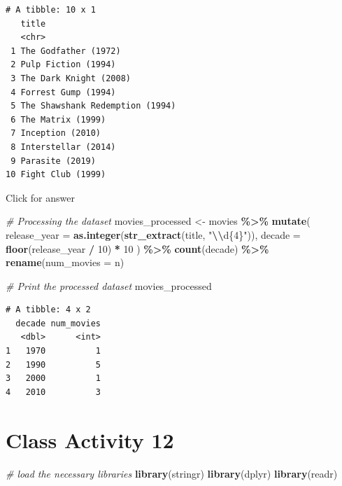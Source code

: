 \documentclass[
]{book}
\newenvironment{Shaded}{\begin{snugshade}}{\end{snugshade}}
\newcommand{\AttributeTok}[1]{\textcolor[rgb]{0.13,0.29,0.53}{#1}}
\newcommand{\CommentTok}[1]{\textcolor[rgb]{0.56,0.35,0.01}{\textit{#1}}}
\newcommand{\DecValTok}[1]{\textcolor[rgb]{0.00,0.00,0.81}{#1}}
\newcommand{\FunctionTok}[1]{\textcolor[rgb]{0.13,0.29,0.53}{\textbf{#1}}}
\newcommand{\NormalTok}[1]{#1}
\newcommand{\OtherTok}[1]{\textcolor[rgb]{0.56,0.35,0.01}{#1}}
\newcommand{\SpecialCharTok}[1]{\textcolor[rgb]{0.81,0.36,0.00}{\textbf{#1}}}
\newcommand{\StringTok}[1]{\textcolor[rgb]{0.31,0.60,0.02}{#1}}
\begin{document}
\begin{verbatim}
# A tibble: 10 x 1
   title                          
   <chr>                          
 1 The Godfather (1972)           
 2 Pulp Fiction (1994)            
 3 The Dark Knight (2008)         
 4 Forrest Gump (1994)            
 5 The Shawshank Redemption (1994)
 6 The Matrix (1999)              
 7 Inception (2010)               
 8 Interstellar (2014)            
 9 Parasite (2019)                
10 Fight Club (1999)              
\end{verbatim}

Click for answer

\begin{Shaded}
\begin{Highlighting}[]
\CommentTok{\# Processing the dataset}
\NormalTok{movies\_processed }\OtherTok{\textless{}{-}}\NormalTok{ movies }\SpecialCharTok{\%\textgreater{}\%}
  \FunctionTok{mutate}\NormalTok{(}
    \AttributeTok{release\_year =} \FunctionTok{as.integer}\NormalTok{(}\FunctionTok{str\_extract}\NormalTok{(title, }\StringTok{"}\SpecialCharTok{\textbackslash{}\textbackslash{}}\StringTok{d\{4\}"}\NormalTok{)),}
    \AttributeTok{decade =} \FunctionTok{floor}\NormalTok{(release\_year }\SpecialCharTok{/} \DecValTok{10}\NormalTok{) }\SpecialCharTok{*} \DecValTok{10}
\NormalTok{  ) }\SpecialCharTok{\%\textgreater{}\%}
  \FunctionTok{count}\NormalTok{(decade) }\SpecialCharTok{\%\textgreater{}\%}
  \FunctionTok{rename}\NormalTok{(}\AttributeTok{num\_movies =}\NormalTok{ n)}

\CommentTok{\# Print the processed dataset}
\NormalTok{movies\_processed}
\end{Highlighting}
\end{Shaded}

\begin{verbatim}
# A tibble: 4 x 2
  decade num_movies
   <dbl>      <int>
1   1970          1
2   1990          5
3   2000          1
4   2010          3
\end{verbatim}

\hypertarget{class-activity-12}{%
\chapter{Class Activity 12}\label{class-activity-12}}

\begin{Shaded}
\begin{Highlighting}[]
\CommentTok{\# load the necessary libraries}
\FunctionTok{library}\NormalTok{(stringr)}
\FunctionTok{library}\NormalTok{(dplyr)}
\FunctionTok{library}\NormalTok{(readr)}
\end{Highlighting}
\end{Shaded}
\end{document}
